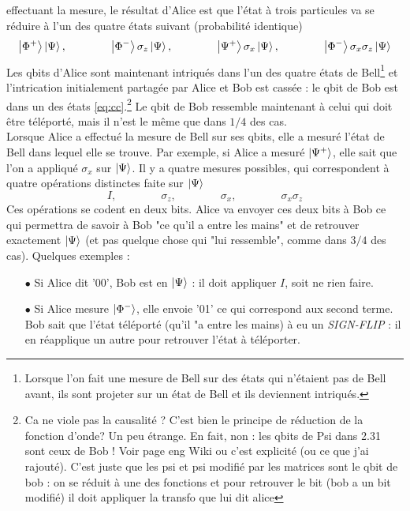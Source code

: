 effectuant la mesure, le résultat d'Alice est que l'état à trois particules va se réduire à l'un
des quatre états suivant (probabilité identique)
\begin{equation}
\ket{\Phi^+}\ket{\Psi},\qquad\qquad
\ket{\Phi^-}\sigma_z\ket{\Psi},\qquad\qquad\ket{\Psi^+}\sigma_x\ket{\Psi},\qquad\qquad\ket{\Phi^-}\sigma_x\sigma_z\ket{\Psi}
\label{eq:cc}
\end{equation}
Les qbits d'Alice sont maintenant intriqués dans l'un des quatre états de Bell\footnote{Lorsque 
l'on fait une mesure de Bell sur des états qui n'étaient pas de Bell avant, ils sont projeter sur un état de Bell et ils deviennent intriqués.} et l'intrication initialement partagée par Alice et Bob est cassée :
le qbit de Bob est dans un des états \eqref{eq:cc}.\footnote{Ca ne viole pas la causalité ? C'est bien le principe de réduction de la fonction d'onde? Un peu étrange. En fait, non : les qbits de Psi dans 2.31 sont ceux de Bob ! Voir page eng Wiki ou c'est explicité (ou ce que j'ai rajouté). C'est juste que les psi et psi modifié par les matrices sont le qbit de bob : on se réduit à une des fonctions et pour retrouver le bit (bob a un bit modifié) il doit appliquer la transfo que lui dit alice} Le qbit de Bob ressemble maintenant à celui qui doit être téléporté, mais il n'est le même que dans $1/4$ des cas.\\

Lorsque Alice a effectué la mesure de Bell sur ses qbits, elle a mesuré l'état de Bell dans lequel
elle se trouve. Par exemple, si Alice a mesuré $\ket{\Psi^+}$, elle sait que l'on a appliqué $\sigma_x$ sur $\ket\Psi$. Il y a quatre mesures possibles, qui correspondent à quatre opérations distinctes faite sur $\ket\Psi$
\begin{equation}
I,\qquad\qquad \sigma_z,\qquad\qquad\sigma_x,\qquad\qquad\sigma_x\sigma_z
\end{equation}
Ces opérations se codent en deux bits. Alice va envoyer ces deux bits à Bob ce qui permettra de 
savoir à Bob "ce qu'il a entre les mains" et de retrouver exactement $\ket\Psi$ (et pas quelque
chose qui "lui ressemble", comme dans $3/4$ des cas). Quelques exemples :

\begin{itemize}
\item[$\bullet$] Si Alice dit '00', Bob est en $\ket\Psi$ : il doit appliquer $I$, soit ne rien faire. 
\item[$\bullet$] Si Alice mesure $\ket{\Phi^-}$, elle envoie '01' ce qui correspond aux second
terme. Bob sait que l'état téléporté (qu'il "a entre les mains) à eu un \textit{SIGN-FLIP} : il en réapplique un autre pour retrouver l'état à téléporter. 
\end{itemize}

